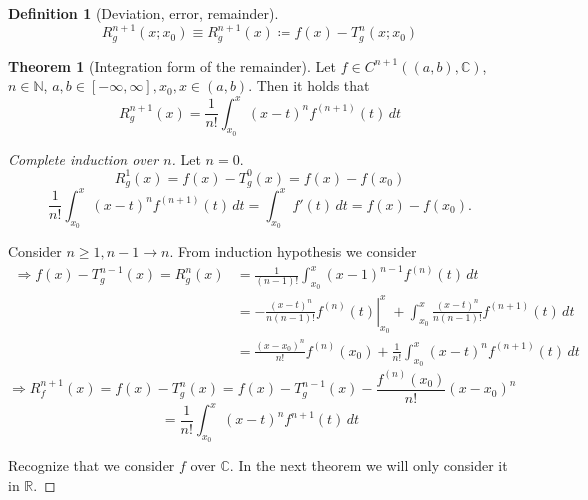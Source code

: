 \documentclass[a4paper,landscape,twocolumn]{article}
\theoremstyle{definition}
\newtheorem{theorem}{Theorem}
\newtheorem{defi}{Definition}
\begin{document}
\begin{defi}[Deviation, error, remainder]
  \[ R_g^{n+1}(x; x_0) \equiv R_g^{n+1}(x) \coloneqq f(x) - T_g^n(x; x_0) \]
\end{defi}
\begin{theorem}[Integration form of the remainder]
  Let $f \in C^{n+1}((a,b), \mathbb C)$, $n \in \mathbb N$,
  $a,b \in [-\infty, \infty], x_0, x \in (a,b)$. Then it holds that
  \[
    R_g^{n+1}(x) = \frac{1}{n!} \int_{x_0}^x (x - t)^n f^{(n+1)}(t) \, dt
  \]
\end{theorem}
\begin{proof}[Complete induction over $n$]
  Let $n = 0$.
  \[ R_g^1(x) = f(x) - T_g^0(x) = f(x) - f(x_0) \]
  \[
    \frac1{n!} \int_{x_0}^{x} (x - t)^n f^{(n+1)} (t) \, dt
    = \int_{x_0}^x f'(t) \, dt = f(x) - f(x_0).
  \]

  Consider $n\geq 1, n-1 \to n$.
  From induction hypothesis we consider
  \begin{align*}
    \Rightarrow f(x) - T_g^{n-1}(x) = R_g^n(x)
    &= \frac{1}{(n-1)!} \int_{x_0}^x (x - 1)^{n-1} f^{(n)}(t) \, dt \\
    &= - \left.\frac{(x - t)^n}{n (n-1)!} f^{(n)}(t)\right|_{x_0}^x + \int_{x_0}^x \frac{(x - t)^n}{n (n-1)!} f^{(n+1)}(t) \, dt \\
    &= \frac{(x - x_0)^n}{n!} f^{(n)}(x_0) + \frac{1}{n!} \int_{x_0}^x (x - t)^n f^{(n+1)}(t) \, dt
  \end{align*}
  \[ \Rightarrow R_f^{n+1}(x) = f(x) - T_g^n(x) = f(x) - T_g^{n-1}(x) - \frac{f^{(n)}(x_0)}{n!}(x - x_0)^n \]
  \[ = \frac{1}{n!} \int_{x_0}^x (x - t)^n f^{n+1}(t) \, dt \]

  Recognize that we consider $f$ over $\mathbb C$. In the next theorem we will only
  consider it in $\mathbb R$.
\end{proof}
\end{document}
